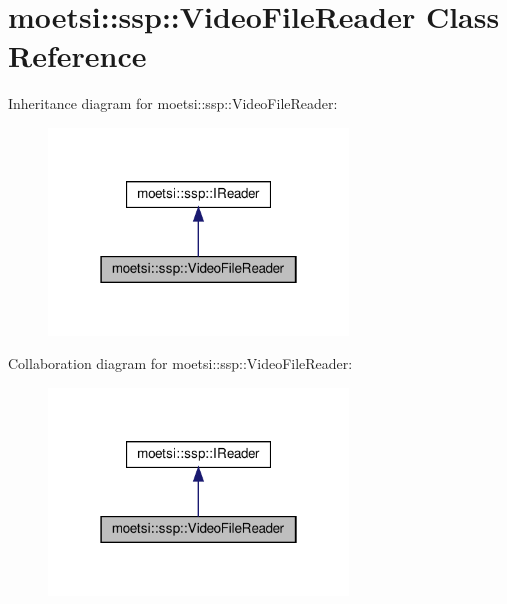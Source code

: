 \hypertarget{classmoetsi_1_1ssp_1_1VideoFileReader}{}\section{moetsi\+:\+:ssp\+:\+:Video\+File\+Reader Class Reference}
\label{classmoetsi_1_1ssp_1_1VideoFileReader}


Inheritance diagram for moetsi\+:\+:ssp\+:\+:Video\+File\+Reader\+:\nopagebreak
\begin{figure}[H]
\begin{center}
\leavevmode
\includegraphics[width=226pt]{classmoetsi_1_1ssp_1_1VideoFileReader__inherit__graph}
\end{center}
\end{figure}


Collaboration diagram for moetsi\+:\+:ssp\+:\+:Video\+File\+Reader\+:\nopagebreak
\begin{figure}[H]
\begin{center}
\leavevmode
\includegraphics[width=226pt]{classmoetsi_1_1ssp_1_1VideoFileReader__coll__graph}
\end{center}
\end{figure}
